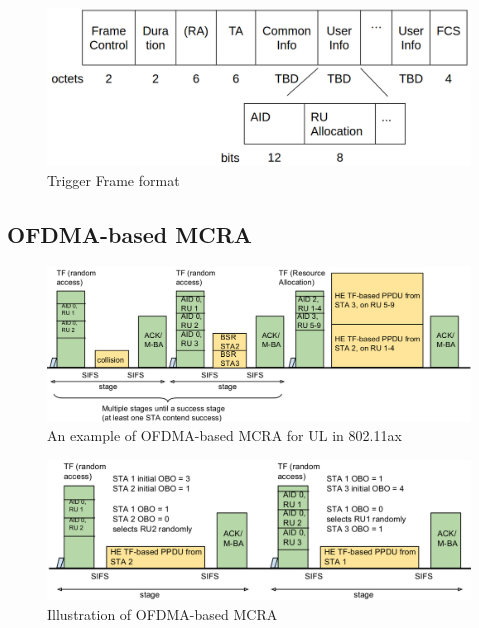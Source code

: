 \documentclass[journal]{IEEEtran}
\begin{document}
\begin{figure}[!t]
\includegraphics[scale=0.2]{./figure/fig_tf_format.png}
\caption{Trigger Frame format}
\label{fig_TF_format}
\end{figure}




\subsection{OFDMA-based MCRA}		\label{sec_RA_illu}

\begin{figure}[!ht]
\centering
\includegraphics[scale=0.35]{./figure/RA_illu_2.png}
\caption{An example of OFDMA-based MCRA for UL in 802.11ax }
\label{fig_ra_ul}
\end{figure}

\begin{figure}[!ht]
\centering
\includegraphics[scale=0.35]{./figure/RA_illu.png}
\caption{Illustration of OFDMA-based MCRA}
\label{fig_ra_illu}
\end{figure}
\end{document}
